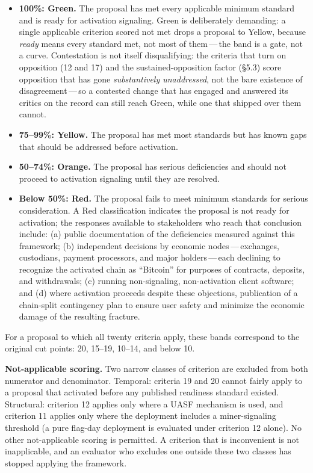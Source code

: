 \documentclass[11pt, twoside, openright]{book}
\newcommand{\sect}[1]{\S#1}
\begin{document}
\begin{itemize}
  \item \textbf{100\%: Green.} The proposal has met every applicable minimum standard and is ready for activation signaling. Green is deliberately demanding: a single applicable criterion scored not met drops a proposal to Yellow, because \textit{ready} means every standard met, not most of them\,---\,the band is a gate, not a curve. Contestation is not itself disqualifying: the criteria that turn on opposition (12 and 17) and the sustained-opposition factor (\sect{5.3}) score opposition that has gone \textit{substantively unaddressed}, not the bare existence of disagreement\,---\,so a contested change that has engaged and answered its critics on the record can still reach Green, while one that shipped over them cannot.
  \item \textbf{75--99\%: Yellow.} The proposal has met most standards but has known gaps that should be addressed before activation.
  \item \textbf{50--74\%: Orange.} The proposal has serious deficiencies and should not proceed to activation signaling until they are resolved.
  \item \textbf{Below 50\%: Red.} The proposal fails to meet minimum standards for serious consideration. A Red classification indicates the proposal is not ready for activation; the responses available to stakeholders who reach that conclusion include: (a) public documentation of the deficiencies measured against this framework; (b) independent decisions by economic nodes\,---\,exchanges, custodians, payment processors, and major holders\,---\,each declining to recognize the activated chain as ``Bitcoin'' for purposes of contracts, deposits, and withdrawals; (c) running non-signaling, non-activation client software; and (d) where activation proceeds despite these objections, publication of a chain-split contingency plan to ensure user safety and minimize the economic damage of the resulting fracture.
\end{itemize}

For a proposal to which all twenty criteria apply, these bands correspond to the original cut points: 20, 15--19, 10--14, and below 10.

\textbf{Not-applicable scoring.} Two narrow classes of criterion are excluded from both numerator and denominator. Temporal: criteria 19 and 20 cannot fairly apply to a proposal that activated before any published readiness standard existed. Structural: criterion 12 applies only where a UASF mechanism is used, and criterion 11 applies only where the deployment includes a miner-signaling threshold (a pure flag-day deployment is evaluated under criterion 12 alone). No other not-applicable scoring is permitted. A criterion that is inconvenient is not inapplicable, and an evaluator who excludes one outside these two classes has stopped applying the framework.
\end{document}
